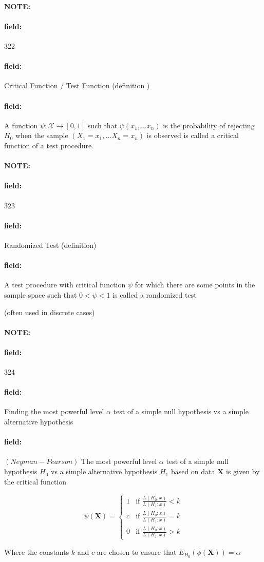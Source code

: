 \documentclass[12pt]{article}
\newenvironment{note}{\paragraph{NOTE:}}{}
\newenvironment{field}{\paragraph{field:}}{}
\begin{document}
\begin{note}
    \begin{field}
        \tiny 322
    \end{field}
    \begin{field}
        Critical Function / Test Function (definition )
    \end{field}
    \begin{field}
        A function $\psi: \mathscr{X} \to [0,1] $ such that $\psi(x_1, \ldots x_n)$ is the probability of rejecting $H_0$ when the sample $(X_1 = x_1, \ldots X_n = x_n)$ is observed is called a critical function of a test procedure.
    \end{field}
\end{note}

\begin{note}
    \begin{field}
        \tiny 323
    \end{field}
    \begin{field}
        Randomized Test (definition)
    \end{field}
    \begin{field}
        A test procedure with critical function $\psi$ for which there are some points in the sample space such that $0 < \psi < 1$ is called a randomized test

        (often used in discrete cases)
    \end{field}
\end{note}


\begin{note}
    \begin{field}
        \tiny 324
    \end{field}
    \begin{field}
        Finding the most powerful level $\alpha$ test of a simple null hypothesis vs a simple alternative hypothesis
    \end{field}
    \begin{field}
        $(Neyman-Pearson)$
        The most powerful level $\alpha$ test of a simple null hypothesis $H_0$ vs a simple alternative hypothesis $H_1$ based on data $\mathbf{X}$ is given by the critical function

          \[
          \psi(\mathbf{X}) =
          \begin{cases}
              1 & \text{if } \frac{L(H_0:x)}{L(H_1:x)} < k  \\
              c & \text{if } \frac{L(H_0:x)}{L(H_1:x)} = k\\
              0 & \text{if } \frac{L(H_0:x)}{L(H_1:x)} > k
          \end{cases}
        \]


         Where the constants $k$ and $c$ are chosen to ensure that $E_{H_0}(\phi(\mathbf{X})) = \alpha$
    \end{field}
\end{note}
\end{document}

